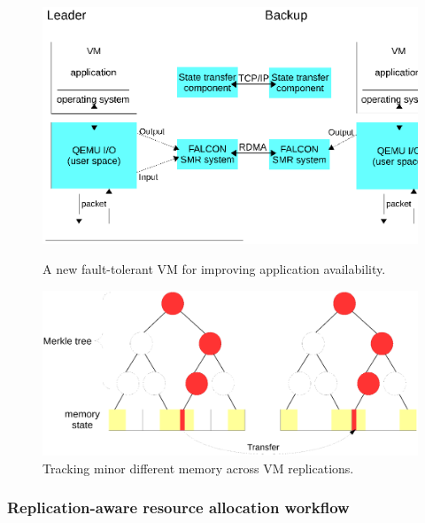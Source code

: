 \begin{figure}[!htb]
    \begin{minipage}{.49\textwidth}
        \vspace{-.2in}
        \includegraphics[width=0.34\textheight]{figures/vm_arch.ps}
        \vspace{-.3in}
        \caption{A new fault-tolerant VM for improving application 
availability.}
        \label{fig:vm-arch}
    \end{minipage}
    \begin{minipage}{0.51\textwidth}
        \vspace{-.2in}
        \includegraphics[width=0.34\textheight]{figures/tree.ps}
        \vspace{-.3in}
        \caption{Tracking minor different memory across VM replications.}
        \label{fig:vm-tree}
    \end{minipage}
\end{figure}

\vspace{-.15in}\subsubsection{Replication-aware resource allocation workflow}
\label{sec:workflow}\vspace{-.075in}


